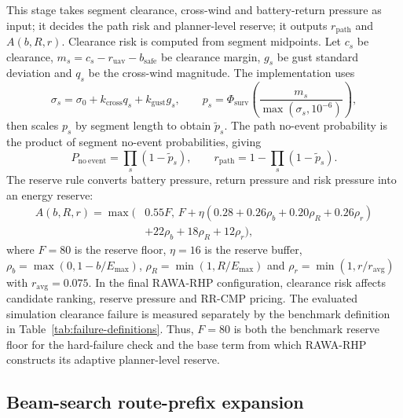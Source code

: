 \documentclass[preprint,12pt]{elsarticle}
\begin{document}
This stage takes segment clearance, cross-wind and battery-return pressure as input; it decides the path risk and planner-level reserve; it outputs $r_{\mathrm{path}}$ and $A(b,R,r)$. Clearance risk is computed from segment midpoints. Let $c_s$ be clearance, $m_s=c_s-r_{\mathrm{uav}}-b_{\mathrm{safe}}$ be clearance margin, $g_s$ be gust standard deviation and $q_s$ be the cross-wind magnitude. The implementation uses
\begin{equation}
    \sigma_s=\sigma_0+k_{\mathrm{cross}}q_s+k_{\mathrm{gust}}g_s,\qquad
    p_s=\Phi_{\mathrm{surv}}\left(\frac{m_s}{\max(\sigma_s,10^{-6})}\right),
    \label{eq:local-risk}
\end{equation}
then scales $p_s$ by segment length to obtain $\tilde{p}_s$. The path no-event probability is the product of segment no-event probabilities, giving
\begin{equation}
    P_{\mathrm{no\ event}}=\prod_s(1-\tilde{p}_s),\qquad
    r_{\mathrm{path}}=1-\prod_s(1-\tilde{p}_s).
    \label{eq:path-risk}
\end{equation}
The reserve rule converts battery pressure, return pressure and risk pressure into an energy reserve:
\begin{equation}
    \begin{aligned}
    A(b,R,r)=\max\big(&0.55F,\,
    F+\eta(0.28+0.26\rho_b+0.20\rho_R+0.26\rho_r)\\
    &+22\rho_b+18\rho_R+12\rho_r\big),
    \end{aligned}
    \label{eq:adaptive-reserve}
\end{equation}
where $F=80$ is the reserve floor, $\eta=16$ is the reserve buffer, $\rho_b=\max(0,1-b/E_{\max})$, $\rho_R=\min(1,R/E_{\max})$ and $\rho_r=\min(1,r/r_{\mathrm{avg}})$ with $r_{\mathrm{avg}}=0.075$. In the final RAWA-RHP configuration, clearance risk affects candidate ranking, reserve pressure and RR-CMP pricing. The evaluated simulation clearance failure is measured separately by the benchmark definition in Table~\ref{tab:failure-definitions}. Thus, $F=80$ is both the benchmark reserve floor for the hard-failure check and the base term from which RAWA-RHP constructs its adaptive planner-level reserve.

\subsection{Beam-search route-prefix expansion}
\end{document}
